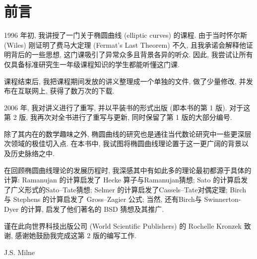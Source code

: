 \chapter*{前言}

1996 年初, 我讲授了一门关于椭圆曲线 (elliptic curves) 的课程. 由于当时怀尔斯 (Wiles) 刚证明了费马大定理 (Fermat's Last Theorem) 不久, 且我承诺会解释他证明背后的一些思想, 这门课吸引了异常众多且背景各异的听众. 因此, 我尝试让所有仅具备标准研究生一年级课程知识的学生都能听懂这门课.

课程结束后, 我把课程期间发放的讲义整理成一个单独的文件, 做了少量修改, 并发布在互联网上, 获得了数万次的下载.

2006 年, 我对讲义进行了重写, 并以平装书的形式出版 (即本书的第 1 版). 对于这第 2 版, 我再次对全书进行了重写与更新, 同时保留了第 1 版的大部分编号.

除了其内在的数学趣味之外, 椭圆曲线的研究也是通往当代数论研究中一些更深层次领域的极佳切入点. 在本书中, 我试图将椭圆曲线理论置于这一更广阔的背景以及历史脉络之中.

在回顾椭圆曲线理论的发展历程时, 我深感其中有如此多的理论最初都源于具体的计算: Ramanujan 的计算启发了 Hecke 算子与Ramanujan猜想; Sato 的计算启发了广义形式的Sato--Tate猜想; Selmer 的计算启发了Cassels--Tate对偶定理; Birch 与 Stephens 的计算启发了 Gross--Zagier 公式; 当然, 还有Birch与 Swinnerton-Dyer 的计算, 启发了他们著名的 BSD 猜想及其推广.

谨在此向世界科技出版公司 (World Scientific Publishers) 的 Rochelle Kronzek 致谢, 感谢她鼓励我完成这第 2 版的编写工作.

\begin{flushright}
J.S. Milne
\end{flushright}